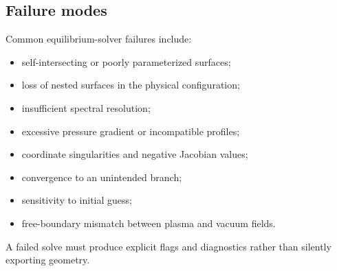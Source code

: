 \subsection{Failure modes}
Common equilibrium-solver failures include:
\begin{itemize}[leftmargin=1.6em]
\item self-intersecting or poorly parameterized surfaces;
\item loss of nested surfaces in the physical configuration;
\item insufficient spectral resolution;
\item excessive pressure gradient or incompatible profiles;
\item coordinate singularities and negative Jacobian values;
\item convergence to an unintended branch;
\item sensitivity to initial guess;
\item free-boundary mismatch between plasma and vacuum fields.
\end{itemize}
A failed solve must produce explicit flags and diagnostics rather than silently exporting geometry.

